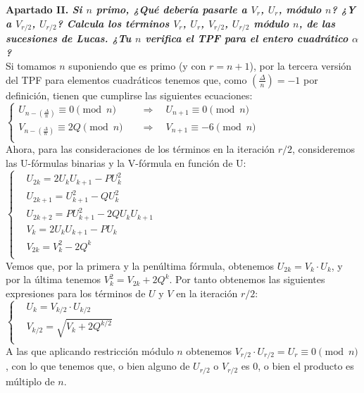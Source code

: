 \documentclass[fleqn]{article}
\def\next{\quad \Rightarrow \quad}
\begin{document}
    \newpage
    \textbf{Apartado II. \textit{Si $n$ primo, ¿Qué debería pasarle a $V_r$, $U_r$, módulo $n$? ¿Y a $V_{r/2}$, $U_{r/2}$?
            Calcula los términos $V_r$, $U_r$, $V_{r/2}$, $U_{r/2}$ módulo $n$, de las sucesiones de Lucas.
            ¿Tu $n$ verifica el TPF para el entero cuadrático $\alpha$?}}\\
    Si tomamos $n$ suponiendo que es primo (y con $r = n+1$), por la tercera versión del TPF para elementos cuadráticos tenemos que, como 
    $\left(\frac{\Delta}{n}\right) = -1$ por definición, tienen que cumplirse las siguientes ecuaciones:\\ 
    $\left\{
    \begin{aligned}
        U_{n-\left(\frac{\Delta}{n}\right)} \equiv 0 \pmod{n} &\next U_{n+1} \equiv 0 \pmod{n} \\
        V_{n-\left(\frac{\Delta}{n}\right)} \equiv 2Q \pmod{n} &\next V_{n+1} \equiv -6 \pmod{n} \\
    \end{aligned}
    \right.$\\
    Ahora, para las consideraciones de los términos en la iteración $r/2$, consideremos las U-fórmulas binarias y la V-fórmula en función de U: \\
    $\left\{
        \begin{aligned}
            &U_{2k} = 2 U_k U_{k+1} - P U_k^2\\
            &U_{2k+1} = U_{k+1}^2 - Q U_k^2\\
            &U_{2k+2} = P U_{k+1}^2 - 2Q U_k U_{k+1} \\
            &V_k = 2 U_k U_{k+1} - P U_k\\
            &V_{2k} = V_{k}^2 - 2Q^k\\
        \end{aligned}
    \right.$\\
    Vemos que, por la primera y la penúltima fórmula, obtenemos $U_{2k} = V_k \cdot U_k$, y por la última tenemos $ V_{k}^2 = V_{2k} + 2Q^k$.
    Por tanto obtenemos las siguientes expresiones para los términos de $U$ y $V$ en la iteración $r/2$:\\
    $\left\{
        \begin{aligned}
            &U_{k} = V_{k/2} \cdot U_{k/2} \\
            &V_{k/2} = \sqrt{V_{k} + 2Q^{k/2}} \\
        \end{aligned}
    \right.$\\
    A las que aplicando restricción módulo $n$ obtenemos  $V_{r/2} \cdot U_{r/2} = U_{r} \equiv 0 \pmod{n}$, con lo que tenemos que, o bien alguno 
    de $U_{r/2}$ o $V_{r/2}$ es 0, o bien el producto es múltiplo de $n$.
    
\end{document}
